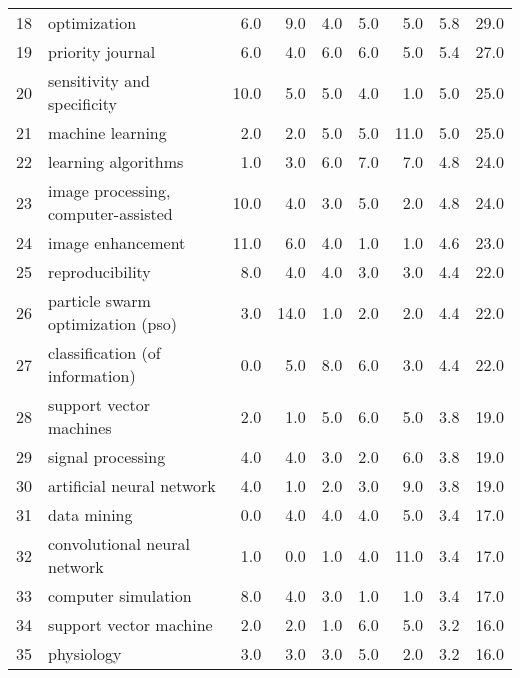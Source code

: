 \begin{tabular}{llrrrrrrr}
18 &                             optimization &   6.0 &   9.0 &   4.0 &   5.0 &   5.0 &   5.8 &   29.0 \\
19 &                         priority journal &   6.0 &   4.0 &   6.0 &   6.0 &   5.0 &   5.4 &   27.0 \\
20 &              sensitivity and specificity &  10.0 &   5.0 &   5.0 &   4.0 &   1.0 &   5.0 &   25.0 \\
21 &                         machine learning &   2.0 &   2.0 &   5.0 &   5.0 &  11.0 &   5.0 &   25.0 \\
22 &                      learning algorithms &   1.0 &   3.0 &   6.0 &   7.0 &   7.0 &   4.8 &   24.0 \\
23 &      image processing, computer-assisted &  10.0 &   4.0 &   3.0 &   5.0 &   2.0 &   4.8 &   24.0 \\
24 &                        image enhancement &  11.0 &   6.0 &   4.0 &   1.0 &   1.0 &   4.6 &   23.0 \\
25 &                          reproducibility &   8.0 &   4.0 &   4.0 &   3.0 &   3.0 &   4.4 &   22.0 \\
26 &        particle swarm optimization (pso) &   3.0 &  14.0 &   1.0 &   2.0 &   2.0 &   4.4 &   22.0 \\
27 &          classification (of information) &   0.0 &   5.0 &   8.0 &   6.0 &   3.0 &   4.4 &   22.0 \\
28 &                  support vector machines &   2.0 &   1.0 &   5.0 &   6.0 &   5.0 &   3.8 &   19.0 \\
29 &                        signal processing &   4.0 &   4.0 &   3.0 &   2.0 &   6.0 &   3.8 &   19.0 \\
30 &                artificial neural network &   4.0 &   1.0 &   2.0 &   3.0 &   9.0 &   3.8 &   19.0 \\
31 &                              data mining &   0.0 &   4.0 &   4.0 &   4.0 &   5.0 &   3.4 &   17.0 \\
32 &             convolutional neural network &   1.0 &   0.0 &   1.0 &   4.0 &  11.0 &   3.4 &   17.0 \\
33 &                      computer simulation &   8.0 &   4.0 &   3.0 &   1.0 &   1.0 &   3.4 &   17.0 \\
34 &                   support vector machine &   2.0 &   2.0 &   1.0 &   6.0 &   5.0 &   3.2 &   16.0 \\
35 &                               physiology &   3.0 &   3.0 &   3.0 &   5.0 &   2.0 &   3.2 &   16.0 \\

\end{tabular}
